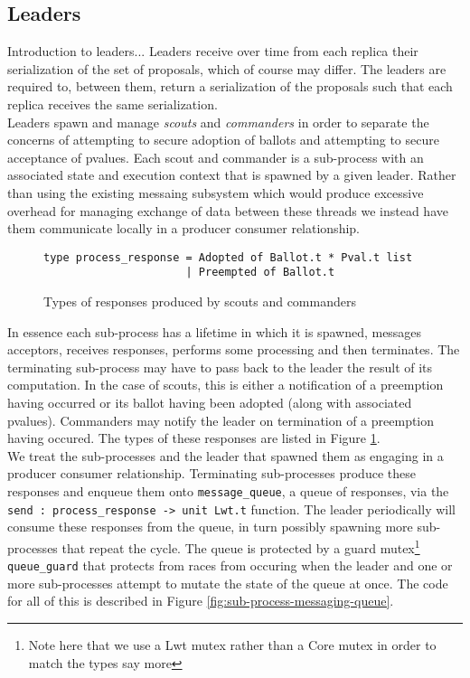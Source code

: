 \subsection{Leaders}

Introduction to leaders... Leaders receive over time from each replica their serialization of the set of proposals, which of course may differ. The leaders are required to, between them, return a serialization of the proposals such that each replica receives the same serialization. \\

Leaders spawn and manage \emph{scouts} and \emph{commanders} in order to separate the concerns of attempting to secure adoption of ballots and attempting to secure acceptance of pvalues. Each scout and commander is a sub-process with an associated state and execution context that is spawned by a given leader. Rather than using the existing messaing subsystem which would produce excessive overhead for managing exchange of data between these threads we instead have them communicate locally in a producer consumer relationship. \\

\begin{figure}
  \begin{lstlisting}
type process_response = Adopted of Ballot.t * Pval.t list
                      | Preempted of Ballot.t    
  \end{lstlisting}
  \caption{Types of responses produced by scouts and commanders}
  \label{fig:sub-process-responses}
\end{figure}

In essence each sub-process has a lifetime in which it is spawned, messages acceptors, receives responses, performs some processing and then terminates. The terminating sub-process may have to pass back to the leader the result of its computation. In the case of scouts, this is either a notification of a preemption having occurred or its ballot having been adopted ({\color{red}along with associated pvalues}). Commanders may notify the leader on termination of a preemption having occured. The types of these responses are listed in Figure \ref{fig:sub-process-responses}. \\

We treat the sub-processes and the leader that spawned them as engaging in a producer consumer relationship. Terminating sub-processes produce these responses and enqueue them onto \texttt{message\_queue}, a queue of responses, via the \texttt{send : process\_response -> unit Lwt.t} function. The leader periodically will consume these responses from the queue, in turn possibly spawning more sub-processes that repeat the cycle. The queue is protected by a guard mutex\footnote{Note here that we use a Lwt mutex rather than a Core mutex in order to match the types {\color{red}say more}} \texttt{queue\_guard} that protects from races from occuring when the leader and one or more sub-processes attempt to mutate the state of the queue at once. {\color{red}The code for all of this is described in Figure \ref{fig:sub-process-messaging-queue}}. \\

